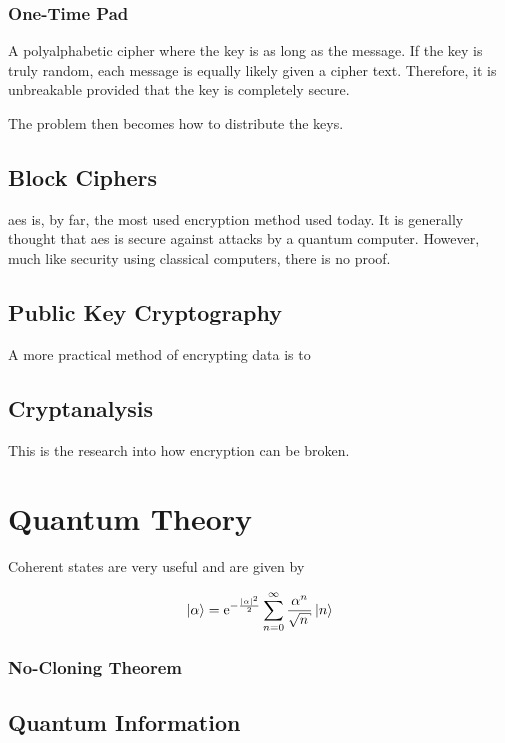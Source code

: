 \subsubsection*{One-Time Pad}

A polyalphabetic cipher where the key is as long as the message. If the key is truly random, each message is equally likely given a cipher text. Therefore, it is unbreakable provided that the key is completely secure.

The problem then becomes how to distribute the keys.

\subsection{Block Ciphers}

\Ac{aes} is, by far, the most used encryption method used today. It is generally thought that \ac{aes} is secure against attacks by a quantum computer. However, much like security using classical computers, there is no proof.

\subsection{Public Key Cryptography}

A more practical method of encrypting data is to 

\subsection{Cryptanalysis}
\label{sec1:cryptanalysis}

This is the research into how encryption can be broken.

\section{Quantum Theory}

Coherent states are very useful and are given by

\begin{equation}
	\ket{\alpha} = \mathrm{e}^{-\frac{|\alpha|^2}{2}} \sum_{n=0}^\infty \frac{\alpha^n}{\sqrt{n}} \ket{n} 
\end{equation}

\subsubsection{No-Cloning Theorem}

\subsection{Quantum Information}

